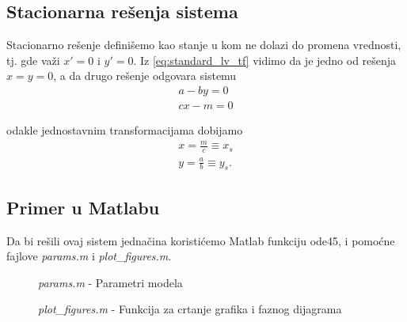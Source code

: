 \documentclass[a4paper]{article}
\begin{document}
\subsection{Stacionarna rešenja sistema}

Stacionarno rešenje definišemo kao stanje u kom ne dolazi do promena vrednosti, tj.
gde važi $x' = 0$ i $y' = 0$.
Iz \eqref{eq:standard_lv_tf} vidimo da je jedno od rešenja $x = y = 0$,
a da drugo rešenje odgovara sistemu
    \begin{displaymath}
        \begin{aligned}
            a - by = 0\\
            cx - m = 0
        \end{aligned}
    \end{displaymath}

odakle jednostavnim transformacijama dobijamo
    \begin{equation}
        \label{eq:stac_sol_std}
        \begin{aligned}
            x = \frac{m}{c} \equiv x_s\\
            y = \frac{a}{b} \equiv y_s.
        \end{aligned}
    \end{equation}

\subsection{Primer u Matlabu}
\label{sub:std_primer}
Da bi rešili ovaj sistem jednačina koristićemo Matlab funkciju ode45, i pomoćne fajlove
{\em params.m} i {\em plot\_figures.m}.
\begin{figure}[H]

\caption{{\em params.m} - Parametri modela}
\end{figure}
\begin{figure}[H]

\caption{{\em plot\_figures.m} - Funkcija za crtanje grafika i faznog dijagrama}
\end{figure}
\begin{figure}[H]

\end{figure}
\end{document}
